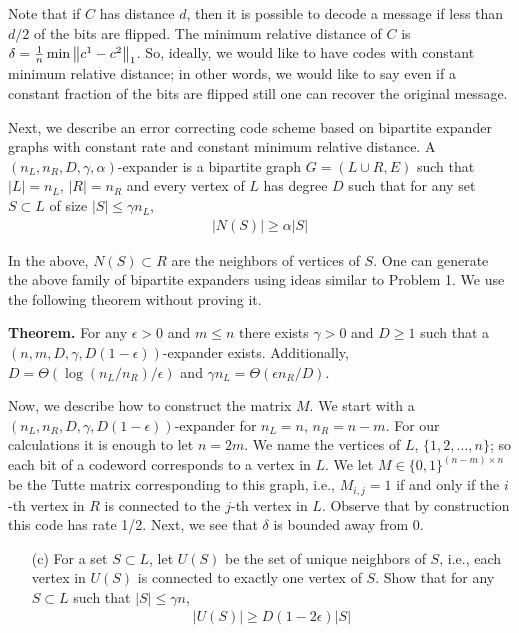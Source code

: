\documentclass[10pt]{article}
\begin{document}
\begin{problem}[Problem 5]
    Note that if \( C \) has distance \( d \), then it is possible to decode a message if less than \( d/2 \) of the bits are flipped. The minimum relative distance of \( C \) is \( \delta = \frac{1}{n} \min \left\lVert c^1-c^2\right\rVert_1 \). So, ideally, we would like to have codes with constant minimum relative distance; in other words, we would like to say even if a constant fraction of the bits are flipped still one can recover the original message.

    Next, we describe an error correcting code scheme based on bipartite expander graphs with constant rate
    and constant minimum relative distance. A \( (n_L,n_R,D,\gamma,\alpha) \)-expander is a bipartite graph \( G = (L\cup R,E) \) such that \( |L| = n_L \), \( |R| = n_R \) and every vertex of \( L \) has degree \( D \) such that for any set \( S\subset L \) of size \( |S| \leq \gamma n_L \), 
    \begin{align*}
        |N(S)| \geq \alpha |S|
    \end{align*}
    
    In the above, \( N(S) \subset R \) are the neighbors of vertices of \( S \). One can generate the above family of bipartite expanders using ideas similar to Problem 1. We use the following theorem without proving it.

    \textbf{Theorem.} For any \( \epsilon > 0 \) and \( m\leq n \) there exists \( \gamma > 0 \) and \( D\geq 1 \) such that a \( (n,m,D,\gamma,D(1-\epsilon)) \)-expander exists. Additionally, \( D = \Theta(\log(n_L/n_R)/\epsilon) \) and \( \gamma n_L = \Theta(\epsilon n_R/D) \).
    
    Now, we describe how to construct the matrix \( M \). We start with a \( (n_L,n_R, D,\gamma, D(1-\epsilon)) \)-expander for \( n_L = n \), \( n_R = n-m \). For our calculations it is enough to let \( n = 2m \). We name the vertices of \( L \), \( \{1,2,\ldots,n\} \);  so each bit of a codeword corresponds to a vertex in \( L \). We let \( M\in\{0,1\}^{(n-m)\times n} \)  be the Tutte matrix corresponding to this graph, i.e., \( M_{i,j} = 1 \) if and only if the \( i \)-th vertex in \( R \) is connected to the \( j \)-th vertex in \( L \).  Observe that by construction this code has rate 1/2. Next, we see that \( \delta \) is bounded away from 0.

    \begin{enumerate}[label=(\alph*),nolistsep]
        \item[(c)] For a set \( S \subset L \), let \( U(S) \) be the set of unique neighbors of \( S \), i.e., each vertex in \( U(S) \) is connected to exactly one vertex of \( S \). Show that for any \( S\subset L \) such that \( |S| \leq \gamma n \), 
            \begin{align*}
                |U(S)| \geq D(1-2 \epsilon) |S|
            \end{align*}
            

\end{enumerate}
\end{problem}
\end{document}
